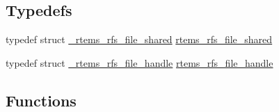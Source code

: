 \subsection*{Typedefs}
\begin{DoxyCompactItemize}
\item 
typedef struct \mbox{\hyperlink{struct__rtems__rfs__file__shared}{\+\_\+rtems\+\_\+rfs\+\_\+file\+\_\+shared}} \mbox{\hyperlink{rtems-rfs-file_8h_adb93e0b8dc15817a098cb105949cc3c7}{rtems\+\_\+rfs\+\_\+file\+\_\+shared}}
\item 
typedef struct \mbox{\hyperlink{struct__rtems__rfs__file__handle}{\+\_\+rtems\+\_\+rfs\+\_\+file\+\_\+handle}} \mbox{\hyperlink{rtems-rfs-file_8h_a35a0f4ad45bd35ea0af7df0aa0ad893b}{rtems\+\_\+rfs\+\_\+file\+\_\+handle}}
\end{DoxyCompactItemize}
\subsection*{Functions}
